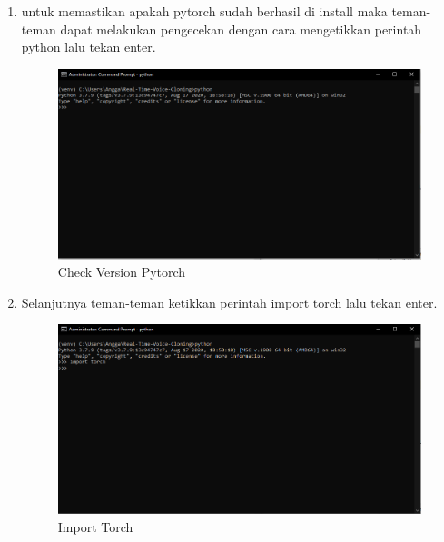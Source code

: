\begin{enumerate}
\item untuk memastikan apakah pytorch sudah berhasil di install maka teman-teman dapat melakukan pengecekan dengan cara mengetikkan perintah python lalu tekan enter.
\begin{figure}[H]
\centering
\includegraphics[scale=.35]{figures/pytorch5}
\caption{Check Version Pytorch}
\label{pytorch5}
\end{figure}

\item Selanjutnya teman-teman ketikkan perintah import torch lalu tekan enter.
\begin{figure}[H]
\centering
\includegraphics[scale=.35]{figures/pytorch6}
\caption{Import Torch}
\label{pytorch6}
\end{figure}


\end{enumerate}
